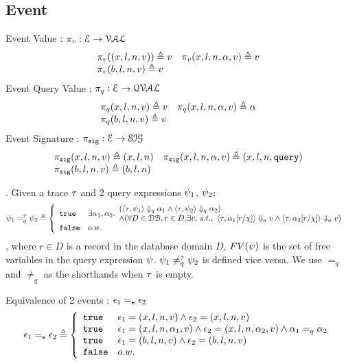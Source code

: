%
%
\subsection{Event}
%
Event Value : $\pi_v : \mathcal{E} \to \mathcal{VAL}$
\[
\begin{array}{ll}
\pi_v((x, l, n, v)) \triangleq v
&
\pi_v (x, l, n, \alpha, v) \triangleq v
\\
\pi_v (b, l, n, v)  \triangleq v
&
\end{array}
\]
%
Event Query Value : $\pi_{q} : \mathcal{E} \to \mathcal{QVAL}$
\[
\begin{array}{ll}
\pi_{q} (x, l, n, v) \triangleq v
&
\pi_{q} (x, l, n, \alpha, v) \triangleq \alpha
\\
\pi_{q} (b, l, n, v)  \triangleq v
&
\end{array}
\]%
% 
Event Signature : $\pi_{\mathtt{sig}} : \mathcal{E} \to \mathcal{SIG}$
\[
\begin{array}{ll}
\pi_{\mathtt{sig}} (x, l, n, v) \triangleq (x, l, n)
&
\pi_{\mathtt{sig}} (x, l, n, \alpha, v) \triangleq (x, l, n, {\tt query})
\\
\pi_{\mathtt{sig}} (b, l, n, v)  \triangleq (b, l, n)
&
\end{array}
\]
%
%
\begin{defn}.
%
\label{def:query_equal}
Given a trace $\mathtt{\tau}$ and 2 query expressions $\psi_1$, $\psi_2$:
$$
\qexpr_1 =_{q}^{\trace} \qexpr_2 \triangleq
\left\{
    \begin{array}{ll} 
      \etrue      
      & 
    \exists \qval_1, \qval_2.
    \begin{array}{l} 
      (\config{\trace,  \qexpr_1} \qarrow \qval_1 \land \config{\trace,  \qexpr_2 } \qarrow \qval_2) 
      \\
      \land (\forall D \in \dbdom, r \in D. \exists v. ~ s.t., ~ 
            \config{\trace, \qval_1[r/\chi]} \aarrow v \land \config{\trace,  \qval_2[r/\chi] } \aarrow v)  
    \end{array}\\
      \efalse         
      & \text{o.w.} 
    \end{array}
    \right.
$$
%
, where $r \in D$ is a record in the database domain $D$, $FV(\psi)$ is the set of free variables in the query expression $\psi$.
$\psi_1 \neq_{q}^{\mathtt{\tau}} \psi_2$  is defined vice versa.
%
We use $=_{q}$  and $\neq_{q}$ as the shorthands when $\mathtt{\tau}$ is empty.
\end{defn}
%
Equivalence of 2 events : $\mathtt{\epsilon}_1 =_{\mathtt{e}} \mathtt{\epsilon}_2$
\[
\event_1 \eventeq \event_2 \triangleq
\left\{
\begin{array}{ll}
\etrue & \event_1 = (x, l, n, v) \land \event_2 = (x, l, n, v) \\
\etrue & \event_1 = (x, l, n, \qval_1, v) \land \event_2 = (x, l, n, \qval_2, v)  
\land \qval_1 =_{q} \qval_2\\
\etrue & \event_1 = (b, l, n, v) \land \event_2 = (b, l, n, v) \\
\efalse & o.w.
\end{array}
\right.
\]
